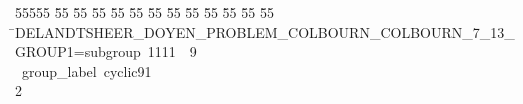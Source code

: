 %
%
\begin{tabbing}
55555 \= 55 \= 55 \= 55 \= 55 \= 55 \= 55 \= 55 \= 55 \= 55 \= 55 \= 55 \= 55 \= \>DELANDTSHEER\_DOYEN\_PROBLEM\_COLBOURN\_COLBOURN\_7\_13\_GROUP1=subgroup\ 1111\ \ 9\\[0pt]
\ group\_label\ cyclic91\\[0pt]
2\>\end{tabbing}

